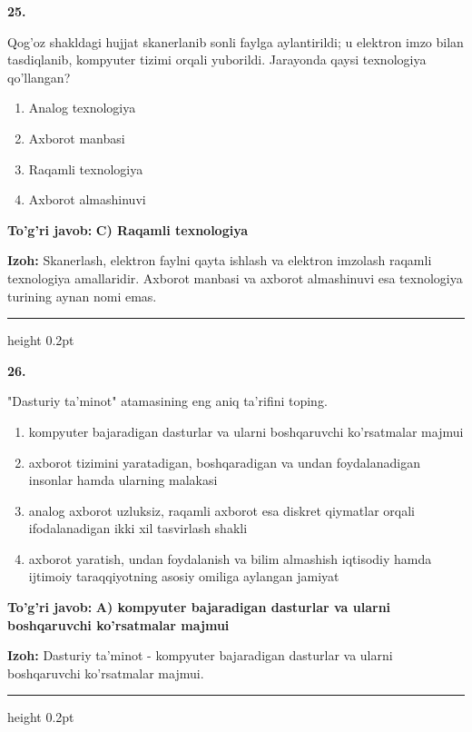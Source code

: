 \documentclass[10pt,a4paper,oneside]{article}
\begin{document}
\noindent\textbf{\color{ink}25.}
\par
Qog'oz shakldagi hujjat skanerlanib sonli faylga aylantirildi; u elektron imzo bilan tasdiqlanib, kompyuter tizimi orqali yuborildi. Jarayonda qaysi texnologiya qo'llangan?
\begin{enumerate}[label=\Alph*),leftmargin=9mm]
\item Analog texnologiya
\item Axborot manbasi
\item Raqamli texnologiya
\item Axborot almashinuvi
\end{enumerate}
\begin{tcolorbox}[enhanced,breakable,colback=teal!4,colframe=teal!50!black,boxrule=0.5pt,arc=1.1mm,left=3mm,right=3mm,top=1.7mm,bottom=1.7mm,before skip=2mm,after skip=2mm]
\textbf{\color{teal}To'g'ri javob:} \textbf{C) Raqamli texnologiya}
\par\smallskip
\textbf{Izoh:} Skanerlash, elektron faylni qayta ishlash va elektron imzolash raqamli texnologiya amallaridir. Axborot manbasi va axborot almashinuvi esa texnologiya turining aynan nomi emas.
\end{tcolorbox}
\vspace{2mm}\hrule height 0.2pt \vspace{3mm}

\noindent\textbf{\color{ink}26.}
\par
"Dasturiy ta'minot" atamasining eng aniq ta'rifini toping.
\begin{enumerate}[label=\Alph*),leftmargin=9mm]
\item kompyuter bajaradigan dasturlar va ularni boshqaruvchi ko'rsatmalar majmui
\item axborot tizimini yaratadigan, boshqaradigan va undan foydalanadigan insonlar hamda ularning malakasi
\item analog axborot uzluksiz, raqamli axborot esa diskret qiymatlar orqali ifodalanadigan ikki xil tasvirlash shakli
\item axborot yaratish, undan foydalanish va bilim almashish iqtisodiy hamda ijtimoiy taraqqiyotning asosiy omiliga aylangan jamiyat
\end{enumerate}
\begin{tcolorbox}[enhanced,breakable,colback=teal!4,colframe=teal!50!black,boxrule=0.5pt,arc=1.1mm,left=3mm,right=3mm,top=1.7mm,bottom=1.7mm,before skip=2mm,after skip=2mm]
\textbf{\color{teal}To'g'ri javob:} \textbf{A) kompyuter bajaradigan dasturlar va ularni boshqaruvchi ko'rsatmalar majmui}
\par\smallskip
\textbf{Izoh:} Dasturiy ta'minot - kompyuter bajaradigan dasturlar va ularni boshqaruvchi ko'rsatmalar majmui.
\end{tcolorbox}
\vspace{2mm}\hrule height 0.2pt \vspace{3mm}
\end{document}
